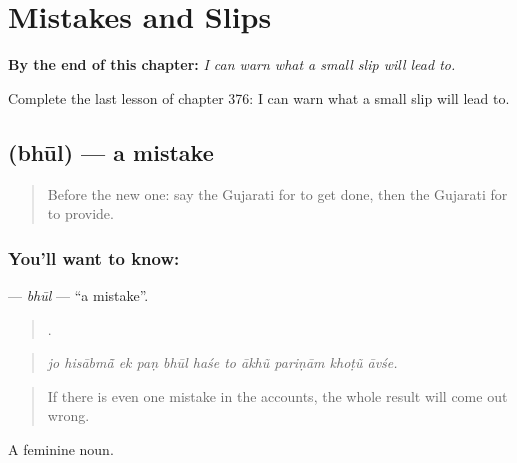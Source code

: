 
\chapter{Mistakes and Slips}
\label{ch:gu-mistakes-and-slips}

\begin{chapteropening}
\textbf{By the end of this chapter:} \emph{I can warn what a small slip will lead to.}

Complete the last lesson of chapter 376: I can warn what a small slip will lead to.
\end{chapteropening}

\section[\texorpdfstring{\gu{ભૂલ} (bhūl)}{ભૂલ (bhūl)}]{ (bhūl) — a mistake}

\label{lesson:GU-C376-bhul}



\begin{quote}
Before the new one: say the Gujarati for to get done, then the Gujarati for to provide.
\end{quote}

\subsection*{You'll want to know: }
\textbf{} — \emph{bhūl} — \textquotedblleft{}a mistake\textquotedblright{}.

\begin{quote}
          .
\end{quote}

\begin{quote}
\emph{jo hisābmā̃ ek paṇ bhūl haśe to ākhũ pariṇām khoṭũ āvśe.}
\end{quote}

\begin{quote}
If there is even one mistake in the accounts, the whole result will come out wrong.
\end{quote}

A feminine noun.

